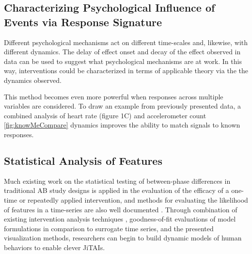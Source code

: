 \subsection{Characterizing Psychological Influence of Events via Response Signature}
Different psychological mechanisms act on different time-scales and, likewise, with different dynamics. 
The delay of effect onset and decay of the effect observed in data can be used to suggest what psychological mechanisms are at work.
In this way, interventions could be characterized in terms of applicable theory via the the dynamics observed.

This method becomes even more powerful when responses across multiple variables are considered.
To draw an example from previously presented data, a combined analysis of heart rate (figure 1C) and accelerometer count \ref{fig:knowMeCompare} dynamics improves the ability to match signals to known responses.

\subsection{Statistical Analysis of Features}
Much existing work on the statistical testing of between-phase differences in traditional AB study designs \cite{parker2003} is applied in the evaluation of the efficacy of a one-time or repeatedly applied intervention, and methods for evaluating the likelihood of features in a time-series are also well documented \cite{gorman1996, suen1989}.
Through combination of existing intervention analysis techniques \cite{box1975}, goodness-of-fit evaluations of model formulations \cite{pankratz2012} in comparison to surrogate time series, and the presented visualization methods, researchers can begin to build dynamic models of human behaviors to enable clever JiTAIs.
